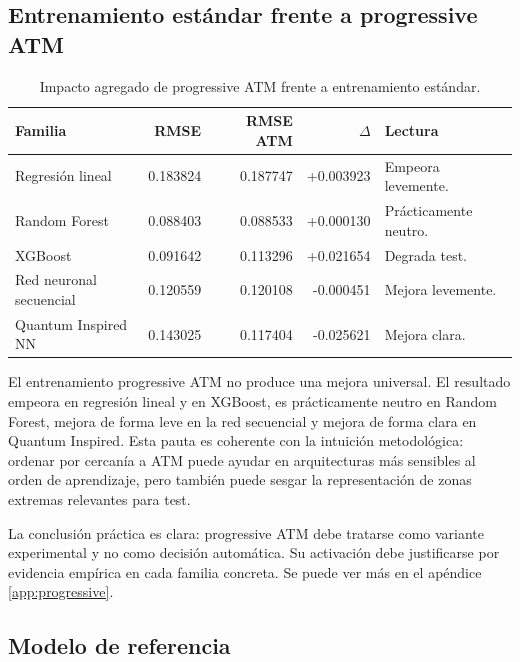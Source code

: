 
\subsection{Entrenamiento estándar frente a progressive ATM}
\label{subsec:normal-vs-progressive}

\begin{table}[htbp]
\centering
\small
\begin{tabularx}{\textwidth}{p{}rrr>{\raggedright\arraybackslash}X}
\toprule
Familia & RMSE & RMSE ATM & \(\Delta\) & Lectura \\
\midrule
Regresión lineal & 0.183824 & 0.187747 & +0.003923 & Empeora levemente. \\
Random Forest & 0.088403 & 0.088533 & +0.000130 & Prácticamente neutro. \\
XGBoost & 0.091642 & 0.113296 & +0.021654 & Degrada test. \\
Red neuronal secuencial & 0.120559 & 0.120108 & -0.000451 & Mejora levemente. \\
Quantum Inspired NN & 0.143025 & 0.117404 & -0.025621 & Mejora clara. \\
\bottomrule
\end{tabularx}
\caption{Impacto agregado de progressive ATM frente a entrenamiento estándar.}
\label{tab:progressive-segmentos}
\end{table}

El entrenamiento progressive ATM no produce una mejora universal. El resultado empeora en regresión lineal y en XGBoost, es prácticamente neutro en Random Forest, mejora de forma leve en la red secuencial y mejora de forma clara en Quantum Inspired. Esta pauta es coherente con la intuición metodológica: ordenar por cercanía a ATM puede ayudar en arquitecturas más sensibles al orden de aprendizaje, pero también puede sesgar la representación de zonas extremas relevantes para test.

La conclusión práctica es clara: progressive ATM debe tratarse como variante experimental y no como decisión automática. Su activación debe justificarse por evidencia empírica en cada familia concreta. Se puede ver más en el apéndice \ref{app:progressive}.

\subsection{Modelo de referencia}
\label{subsec:modelo-final}


